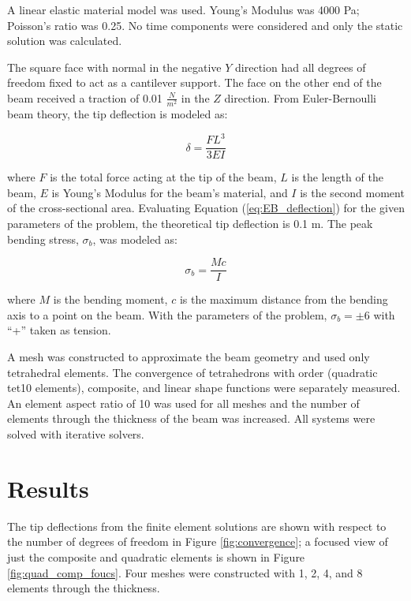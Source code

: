\documentclass[a4paper, 12pt]{article}
\begin{document}
A linear elastic material model was used. 
Young's Modulus was 4000 Pa;
Poisson's ratio was 0.25.
No time components were considered
and only the static solution was calculated.

The square face with normal in the negative $Y$ direction had 
all degrees of freedom fixed to act as a cantilever support. 
The face on the other end of the beam received a 
traction of 0.01 $\frac{N}{m^2}$ in the $Z$ direction.
From Euler-Bernoulli beam theory, the tip deflection
is modeled as:

\begin{equation}
  \delta = \frac{F L^3}{3 E I}
  \label{eq:EB_deflection}
\end{equation}

\noindent
where 
$F$ is the total force acting at the tip of the beam, 
$L$ is the length of the beam,
$E$ is Young's Modulus for the beam's material,
and
$I$ is the second moment of the cross-sectional area.
Evaluating Equation (\ref{eq:EB_deflection}) for the
given parameters of the problem, 
the theoretical tip deflection is 0.1 m.
The peak bending stress, $\sigma_b$, was modeled as:

\begin{equation}
\sigma_b = \frac{M c}{I}
\end{equation}

\noindent
where $M$ is the bending moment, 
$c$ is the maximum distance from the bending axis to a point on the beam.
With the parameters of the problem, $\sigma_b = \pm 6$ 
with ``+'' taken as tension.


A mesh was constructed to approximate the beam geometry
and used only tetrahedral elements.
The convergence of 
tetrahedrons with  order (quadratic tet10 elements),
composite, and linear shape functions
were separately measured.
An element aspect ratio of 10 was used for all meshes
and the number of elements through the thickness of the beam was increased.
All systems were solved with iterative solvers.

\section{Results}
The tip deflections from the finite element solutions
are shown with respect to the number of degrees of freedom 
in Figure \ref{fig:convergence};
a focused view of just the composite and quadratic 
elements is shown in Figure \ref{fig:quad_comp_foucs}.
Four meshes were constructed with 1, 2, 4, and 8 elements
through the thickness.
\end{document}
